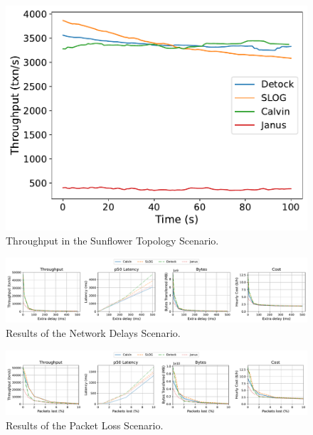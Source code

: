\begin{figure}[ht]
  \centering
  \includegraphics[width=\columnwidth]{figures/Sunflower Throughput.pdf}
  \caption{Throughput in the Sunflower Topology Scenario.}
  \label{fig: sunflower-throughput}
\end{figure}

\begin{figure}[ht]
    \centering
    \includegraphics[width=1\textwidth]{figures/Network.pdf}
    \caption{Results of the Network Delays Scenario.}
    \label{fig: network-delays-scenario}
\end{figure}

\begin{figure}[ht]
    \centering
    \includegraphics[width=1\textwidth]{figures/Packet Loss.pdf}
    \caption{Results of the Packet Loss Scenario.}
    \label{fig: packet-loss-scenario}
\end{figure}

